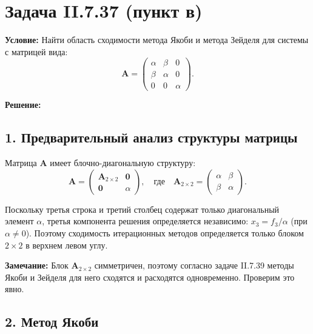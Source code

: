 \documentclass{article}
\begin{document}
\section*{Задача II.7.37 (пункт в)}

\textbf{Условие:} Найти область сходимости метода Якоби и метода Зейделя для системы с матрицей вида:
\begin{equation}
\mathbf{A} = \begin{pmatrix} \alpha & \beta & 0 \\ \beta & \alpha & 0 \\ 0 & 0 & \alpha \end{pmatrix}.
\end{equation}

\vspace{0.5cm}
\textbf{Решение:}

\subsection*{1. Предварительный анализ структуры матрицы}

Матрица $\mathbf{A}$ имеет блочно-диагональную структуру:
\begin{equation}
\mathbf{A} = \begin{pmatrix} \mathbf{A}_{2\times 2} & \mathbf{0} \\ \mathbf{0} & \alpha \end{pmatrix}, \quad \text{где} \quad \mathbf{A}_{2\times 2} = \begin{pmatrix} \alpha & \beta \\ \beta & \alpha \end{pmatrix}.
\end{equation}

Поскольку третья строка и третий столбец содержат только диагональный элемент $\alpha$, третья компонента решения определяется независимо: $x_3 = f_3/\alpha$ (при $\alpha \neq 0$). Поэтому сходимость итерационных методов определяется только блоком $2\times 2$ в верхнем левом углу.

\textbf{Замечание:} Блок $\mathbf{A}_{2\times 2}$ симметричен, поэтому согласно задаче II.7.39 методы Якоби и Зейделя для него сходятся и расходятся одновременно. Проверим это явно.

\subsection*{2. Метод Якоби}
\end{document}
